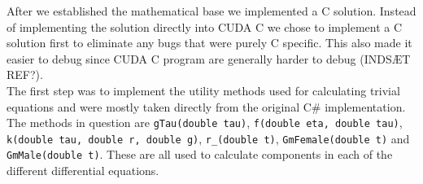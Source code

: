 
After we established the mathematical base we implemented a C solution. Instead of implementing the solution directly into CUDA C we chose to implement a C solution first to eliminate any bugs that were purely C specific. This also made it easier to debug since CUDA C program are generally harder to debug (INDSÆT REF?). \\

The first step was to implement the utility methods used for calculating trivial equations and were mostly taken directly from the original C\# implementation. The methods in question are \texttt{gTau(double tau)}, \texttt{f(double eta, double tau)}, \texttt{k(double tau, double r, double g)}, \texttt{r\_(double t)}, \texttt{GmFemale(double t)} and \texttt{GmMale(double t)}. These are all used to calculate components in each of the different differential equations. \\



